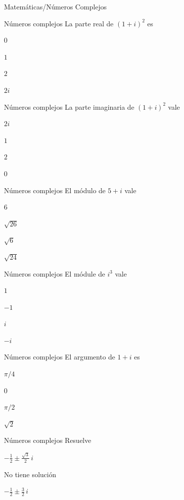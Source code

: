 \documentclass[12pt]{article}
\begin{document}
\begin{quiz}{Matemáticas/Números Complejos}
 
 
 	\begin{multi}[shuffle=true,numbering=none, feedback={	
Si desarrollamos $(1+i)^2=1^2+i^+2i =0+2i$	
	 	}]{Números complejos}
	 	La parte real de $(1+i)^2$ es
		\item* $0$ 
		\item $1$
		\item $2$
		\item $2i$
 	\end{multi}
 
	 
	 \begin{multi}[shuffle=true,numbering=none,feedback={Calcúlese el cuadrado}]%
	 {Números complejos}
		La parte imaginaria de $(1+i)^2$ vale
		\item $2i$
		\item $1$
		\item* $2$
		\item $0$
	 \end{multi}

	 \begin{multi}[shuffle=true,numbering=none]%
	 {Números complejos}
		El módulo de $5+i$ vale 
		\item $6$
		\item* $\sqrt{26}$
		\item $\sqrt{6}$
		\item $\sqrt{24}$
	 \end{multi}

	 \begin{multi}[shuffle=true,numbering=none]%
	 {Números complejos}
		El módule de $i^3$ vale
		\item* $1$
		\item $-1$
		\item $i$
		\item $-i$
	 \end{multi}
	 
	 \begin{multi}[shuffle=true,numbering=none]%
	 {Números complejos}
		El argumento de $1+i$ es
		\item* $\pi/4$
		\item $0$
		\item $\pi/2$
		\item $\sqrt{2}$
	 \end{multi}	 
 			
	 \begin{multi}[shuffle=true,numbering=none]%
	 {Números complejos}
		Resuelve
		\item* $-\frac{1}{2}\pm \frac{\sqrt{3}}{2}\,i $
		\item No tiene solución
		\item $-\frac{1}{2}\pm \frac{3}{2}\, i$
	 \end{multi}
	 

\end{quiz}
\end{document}

